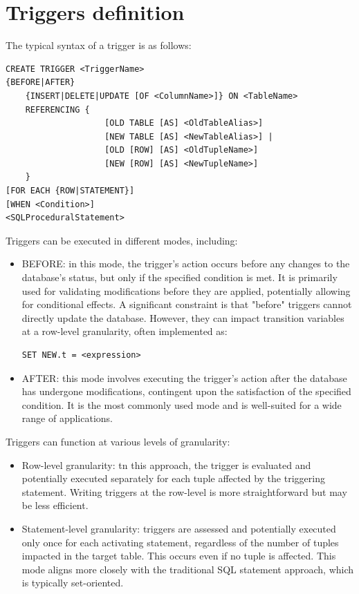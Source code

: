 \documentclass[12pt, a4paper]{report}
\begin{document}
    \section{Triggers definition}
    The typical syntax of a trigger is as follows:
    \begin{lstlisting}[style=SQL]
CREATE TRIGGER <TriggerName>
{BEFORE|AFTER}
    {INSERT|DELETE|UPDATE [OF <ColumnName>]} ON <TableName>
    REFERENCING { 
                    [OLD TABLE [AS] <OldTableAlias>]
                    [NEW TABLE [AS] <NewTableAlias>] |
                    [OLD [ROW] [AS] <OldTupleName>]
                    [NEW [ROW] [AS] <NewTupleName>]
    }
[FOR EACH {ROW|STATEMENT}]
[WHEN <Condition>]
<SQLProceduralStatement> 
    \end{lstlisting}
    Triggers can be executed in different modes, including:
    \begin{itemize}
        \item BEFORE: in this mode, the trigger's action occurs before any changes to the database's status, but only if the specified condition is met.
            It is primarily used for validating modifications before they are applied, potentially allowing for conditional effects.
            A significant constraint is that "before" triggers cannot directly update the database. 
            However, they can impact transition variables at a row-level granularity, often implemented as: 
            \begin{lstlisting}[style=SQL]
SET NEW.t = <expression>
            \end{lstlisting}
        \item AFTER: this mode involves executing the trigger's action after the database has undergone modifications, contingent upon the satisfaction of the specified condition.
            It is the most commonly used mode and is well-suited for a wide range of applications.
    \end{itemize}
    Triggers can function at various levels of granularity:
    \begin{itemize}
        \item Row-level granularity: tn this approach, the trigger is evaluated and potentially executed separately for each tuple affected by the triggering statement. 
            Writing triggers at the row-level is more straightforward but may be less efficient.
        \item Statement-level granularity: triggers are assessed and potentially executed only once for each activating statement, regardless of the number of tuples impacted in the target table. 
            This occurs even if no tuple is affected. 
            This mode aligns more closely with the traditional SQL statement approach, which is typically set-oriented.
    \end{itemize}
\end{document}
